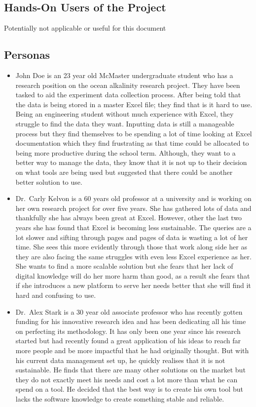 \documentclass[12pt]{article}
\begin{document}
\subsection{Hands-On Users of the Project}
Potentially not applicable or useful for this document

\subsection{Personas}
\begin{itemize}
  \item John Doe is an 23 year old McMaster undergraduate student who has a
  research position on the ocean alkalinity research project. They have been
  tasked to aid the experiment data collection process. After being told that
  the data is being stored in a master Excel file; they find that is it hard to
  use. Being an engineering student without much experience with Excel, they
  struggle to find the data they want. Inputting data is still a manageable
  process but they find themselves to be spending a lot of time looking at Excel
  documentation which they find frustrating as that time could be allocated to
  being more productive during the school term. Although, they want to a better
  way to manage the data, they know that it is not up to their decision on what
  tools are being used but suggested that there could be another better solution
  to use. 
  \item Dr.\ Carly Kelvon is a 60 years old professor at a university and
  is working on her own research project for over five years. She has gathered
  lots of data and thankfully she has always been great at Excel. However, other
  the last two years she has found that Excel is becoming less sustainable. The
  queries are a lot slower and sifting through pages and pages of data is
  wasting a lot of her time. She sees this more evidently through those that
  work along side her as they are also facing the same struggles with even less
  Excel experience as her. She wants to find a more scalable solution but she
  fears that her lack of digital knowledge will do her more harm than good, as a
  result she fears that if she introduces a new platform to serve her needs
  better that she will find it hard and confusing to use. 
  \item Dr.\ Alex Stark is a 30 year old associate professor who has recently
  gotten funding for his innovative research idea and has been dedicating all
  his time on perfecting its methodology. It has only been one year since his
  research started but had recently found a great application of his ideas to
  reach far more people and be more impactful that he had originally thought.
  But with his current data management set up, he quickly realises that it is not
  sustainable. He finds that there are many other solutions on the market but
  they do not exactly meet his needs and cost a lot more than what he can spend
  on a tool. He decided that the best way is to create his own tool but lacks
  the software knowledge to create something stable and reliable. 
\end{itemize}
    
\end{document}
